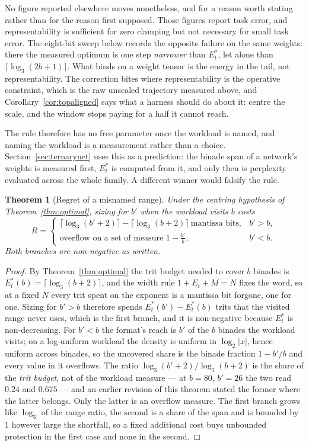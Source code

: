 \documentclass[11pt]{article}
\newtheorem{theorem}{Theorem}
\theoremstyle{definition}
\begin{document}
No figure reported elsewhere moves nonetheless, and for a reason worth stating
rather than for the reason first supposed. Those figures report task error, and
representability is sufficient for zero clamping but not necessary for small task
error. The eight-bit sweep below records the opposite failure on the same weights:
there the measured optimum is one step \emph{narrower} than $E_t^{*}$, let alone
than $\lceil\log_3(2b+1)\rceil$. What binds on a weight tensor is the energy in the
tail, not representability. The correction bites where representability is the
operative constraint, which is the raw unscaled trajectory measured above, and
Corollary~\ref{cor:topaligned} says what a harness should do about it: centre the
scale, and the window stops paying for a half it cannot reach.

The rule therefore has no free parameter once the workload is named, and naming
the workload is a measurement rather than a choice. Section~\ref{sec:ternarynet}
uses this as a prediction: the binade span of a network's weights is measured
first, $E_t^{*}$ is computed from it, and only then is perplexity evaluated across
the whole family. A different winner would falsify the rule.

\begin{theorem}[Regret of a misnamed range]
\label{thm:regret}
Under the centring hypothesis of Theorem~\ref{thm:optimal}, sizing for $b'$ when
the workload visits $b$ costs
\[
  R =
  \begin{cases}
    \lceil\log_3(b'+2)\rceil - \lceil\log_3(b+2)\rceil \ \text{mantissa bits}, & b' > b,\\[2pt]
    \text{overflow on a set of measure } 1 - \tfrac{b'}{b}, & b' < b .
  \end{cases}
\]
Both branches are non-negative as written.
\end{theorem}

\begin{proof}
By Theorem~\ref{thm:optimal} the trit budget needed to cover $b$ binades is
$E_t^{*}(b) = \lceil\log_3(b+2)\rceil$, and the width rule $1 + E_t + M = N$ fixes
the word, so at a fixed $N$ every trit spent on the exponent is a mantissa bit
forgone, one for one. Sizing for $b' > b$ therefore spends
$E_t^{*}(b') - E_t^{*}(b)$ trits that the visited range never uses, which is the
first branch, and it is non-negative because $E_t^{*}$ is non-decreasing. For
$b' < b$ the format's reach is $b'$ of the $b$ binades the workload visits; on a
log-uniform workload the density is uniform in $\log_2|x|$, hence uniform across
binades, so the uncovered share is the binade fraction $1 - b'/b$ and every value
in it overflows. The ratio $\log_3(b'+2)/\log_3(b+2)$ is the share of the
\emph{trit budget}, not of the workload measure --- at $b = 80$, $b' = 26$ the two
read $0.24$ and $0.675$ --- and an earlier revision of this theorem stated the
former where the latter belongs. Only the latter is an overflow measure. The first
branch grows like $\log_3$ of the range ratio, the second is a share of the span
and is bounded by $1$ however large the shortfall, so a fixed additional cost buys
unbounded protection in the first case and none in the second.
\end{proof}
\end{document}
